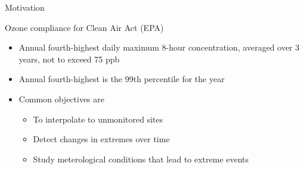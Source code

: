 \documentclass{beamer}
\begin{document}
\begin{frame}{Motivation}
\begin{adjustwidth}{1em}{0em}
  Ozone compliance for Clean Air Act (EPA) \vspace{1em}
  \begin{itemize} \setlength{\itemsep}{1em}
    \item Annual fourth-highest daily maximum 8-hour concentration, averaged over 3 years, not to exceed 75 ppb
    \item Annual fourth-highest is the 99th percentile for the year
    \item Common objectives are \vspace{0.5em}
    \begin{itemize} \setlength{\itemsep}{0.5em}
      \item To interpolate to unmonitored sites
      \item Detect changes in extremes over time
      \item Study meterological conditions that lead to extreme events
    \end{itemize}
  \end{itemize}
\end{adjustwidth}
\end{frame}
\end{document}
